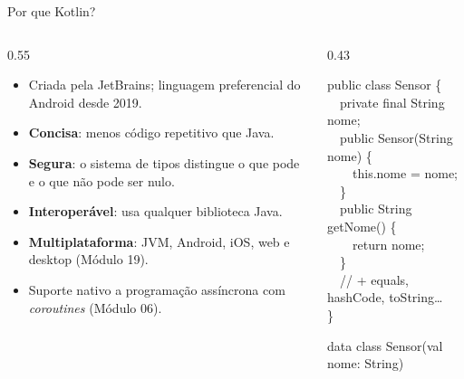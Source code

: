 \documentclass[aspectratio=169,10pt]{beamer}
\begin{document}
\begin{frame}{Por que Kotlin?}
  \begin{columns}[T]
    \begin{column}{0.55\textwidth}
      \begin{itemize}
        \item Criada pela JetBrains; linguagem preferencial do Android desde 2019.
        \item \textbf{Concisa}: menos código repetitivo que Java.
        \item \textbf{Segura}: o sistema de tipos distingue o que pode e o que não pode ser nulo.
        \item \textbf{Interoperável}: usa qualquer biblioteca Java.
        \item \textbf{Multiplataforma}: JVM, Android, iOS, web e desktop (Módulo 19).
        \item Suporte nativo a programação assíncrona com \emph{coroutines} (Módulo 06).
      \end{itemize}
    \end{column}
    \begin{column}{0.43\textwidth}
      \begin{exemplo}[Java]
        \ttfamily\scriptsize
        public class Sensor \{\\
        \ \ private final String nome;\\
        \ \ public Sensor(String nome) \{\\
        \ \ \ \ this.nome = nome;\\
        \ \ \}\\
        \ \ public String getNome() \{\\
        \ \ \ \ return nome;\\
        \ \ \}\\
        \ \ // + equals, hashCode, toString\ldots\\
        \}
      \end{exemplo}
      \begin{exemplo}[Kotlin]
        \ttfamily\scriptsize data class Sensor(val nome: String)
      \end{exemplo}
    \end{column}
  \end{columns}
\end{frame}
\end{document}
